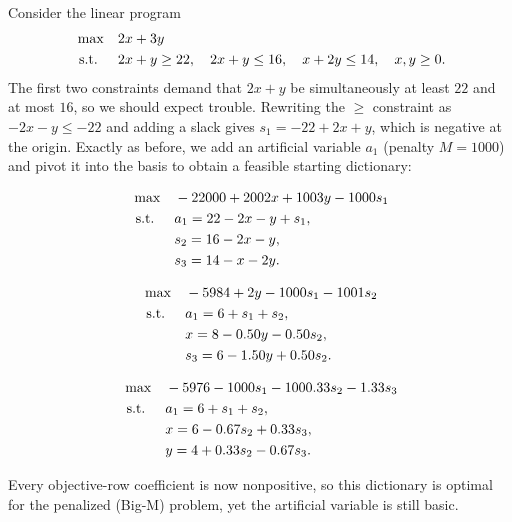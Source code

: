 Consider the linear program
\[
\begin{aligned}
\max\quad & 2x + 3y \\
\text{ s.t. }\quad & 2x + y \geq 22,\quad 2x + y \leq 16,\quad x + 2y \leq 14,\quad x,y \geq 0.
\end{aligned}
\]
The first two constraints demand that $2x+y$ be simultaneously at least $22$ and at most $16$, so we should expect trouble. Rewriting the $\ge$ constraint as $-2x-y\le-22$ and adding a slack gives $s_1 = -22 + 2x + y$, which is negative at the origin. Exactly as before, we add an artificial variable $a_1$ (penalty $M=1000$) and pivot it into the basis to obtain a feasible starting dictionary:
\begin{center}\begin{dict}
\[
\begin{aligned}
\max\quad & -22000 + 2002x + 1003y - 1000s_1 \\
\text{ s.t. }\quad & a_1 = 22 - 2x - y + s_1,\\
& s_2 = 16 - 2x - y,\\
& s_3 = 14 - x - 2y.
\end{aligned}
\]
\end{dict}\end{center}
\begin{center}\begin{dict}
\[
\begin{aligned}
\max\quad & -5984 + 2y - 1000s_1 - 1001s_2 \\
\text{ s.t. }\quad & a_1 = 6 + s_1 + s_2,\\
& x = 8 - 0.50y - 0.50s_2,\\
& s_3 = 6 - 1.50y + 0.50s_2.
\end{aligned}
\]
\end{dict}\end{center}
\begin{center}
\begin{tcolorbox}[enhanced,width=0.6\linewidth,box align=center,colback=red!4,colframe=red!65!black,
  boxrule=0.8pt,sharp corners,coltitle=white,fonttitle=\bfseries,
  title={\ding{56}\ Optimal for Big-M: artificial stuck in basis},
  left=6pt,right=6pt,top=3pt,bottom=3pt]
\[
\begin{aligned}
\max\quad & -5976 - 1000s_1 - 1000.33s_2 - 1.33s_3 \\
\text{ s.t. }\quad & a_1 = 6 + s_1 + s_2,\\
& x = 6 - 0.67s_2 + 0.33s_3,\\
& y = 4 + 0.33s_2 - 0.67s_3.
\end{aligned}
\]
\end{tcolorbox}
\end{center}
Every objective-row coefficient is now nonpositive, so this dictionary is optimal for the penalized (Big-M) problem, yet the artificial variable is still basic.

